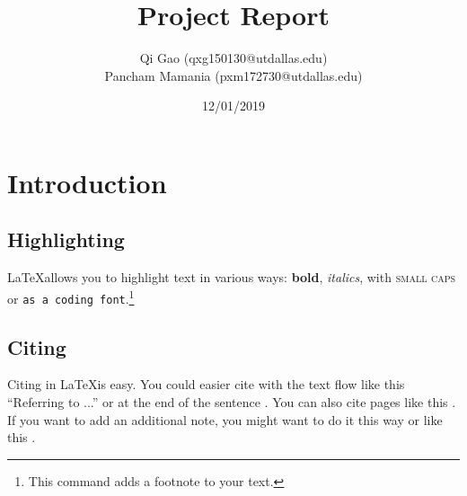 \documentclass[11pt, letterpaper]{article} %
\title{Project Report} %
\author{
Qi Gao \big(qxg150130@utdallas.edu\big)\\
Pancham Mamania \big(pxm172730@utdallas.edu\big)
  }
\date{12/01/2019} %
\begin{document}
%

\maketitle %


\setcounter{page}{1} %
\section{Introduction} %
\subsection{Highlighting} %
\LaTeX allows you to highlight text in various ways: \textbf{bold}, \textit{italics}, with \textsc{small caps} or \texttt{as a coding font}.\footnote{ This command adds a footnote to your text.}

\subsection{Citing} %
Citing in \LaTeX is easy. You could easier cite with the text flow like this ``Referring to \citet{collier2004greed} ...''  or at the end of the sentence \cite{collier2004greed}. You can also cite pages like this \citep[55]{collier2004greed}. If you want to add an additional note, you might want to do it this way \citep[cp.][22]{collier2004greed} or like this \citep[cp.][]{collier2004greed}.\\
\blindtext %
\end{document}
